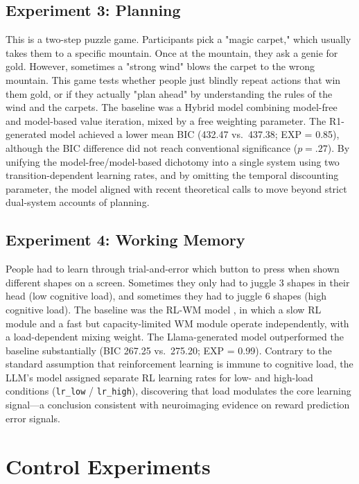 \subsection{Experiment 3: Planning}

This is a two-step puzzle game. Participants pick a "magic carpet," which usually takes them to a specific mountain. Once at the mountain, they ask a genie for gold. However, sometimes a "strong wind" blows the carpet to the wrong mountain. This game tests whether people just blindly repeat actions that win them gold, or if they actually "plan ahead" by understanding the rules of the wind and the carpets. The baseline was a Hybrid model combining model-free and model-based value iteration, mixed by a free weighting parameter. The R1-generated model achieved a lower mean BIC (432.47 vs.\ 437.38; EXP = 0.85), although the BIC difference did not reach conventional significance ($p = .27$). By unifying the model-free/model-based dichotomy into a single system using two transition-dependent learning rates, and by omitting the temporal discounting parameter, the model aligned with recent theoretical calls to move beyond strict dual-system accounts of planning.

\subsection{Experiment 4: Working Memory}

People had to learn through trial-and-error which button to press when shown different shapes on a screen. Sometimes they only had to juggle 3 shapes in their head (low cognitive load), and sometimes they had to juggle 6 shapes (high cognitive load). The baseline was the RL-WM model \citep{collins2012cognitive}, in which a slow RL module and a fast but capacity-limited WM module operate independently, with a load-dependent mixing weight. The Llama-generated model outperformed the baseline substantially (BIC 267.25 vs.\ 275.20; EXP = 0.99). Contrary to the standard assumption that reinforcement learning is immune to cognitive load, the LLM's model assigned separate RL learning rates for low- and high-load conditions (\texttt{lr\_low} / \texttt{lr\_high}), discovering that load modulates the core learning signal---a conclusion consistent with neuroimaging evidence on reward prediction error signals.

\section{Control Experiments}

